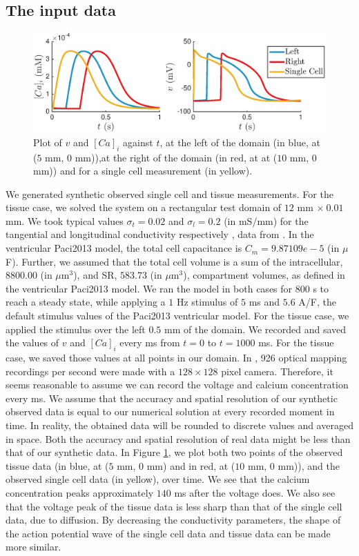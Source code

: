 \documentclass[12pt,a4paper]{article}
\begin{document}
\subsection{The input data} \label{The input data}
%
\begin{figure}
   \includegraphics[width=1\linewidth]{strip} 
    \caption{Plot of $v$ and $[Ca]_i$ against $t$, at the left of the domain (in blue, at ($5$ mm, $0$ mm)),at the right of the domain (in red, at at ($10$ mm, $0$ mm)) and for a single cell measurement (in yellow).}
    \label{fig:3}
\end{figure}
%
We generated synthetic observed single cell and tissue measurements. For the tissue case, we solved the system on a rectangular test domain of $12$ mm $\times\: 0.01$ mm. We took typical values $\sigma_t=0.02$ and $\sigma_l=0.2$ (in mS/mm) for the tangential and longitudinal conductivity respectively \cite{Roth}, data from \cite{Plonsey1882, Plonsey1984}. In the ventricular Paci2013 model, the total cell capacitance is $C_m=9.87109e-5$ (in $\mu$F). Further, we assumed that the total cell volume is a sum of the intracellular, $8800.00$ (in $\mu$m$^3$), and SR, $583.73$ (in $\mu$m$^3$), compartment volumes, as defined in the ventricular Paci2013 model.
We ran the model in both cases for 800 s to reach a steady state, while applying a $1$ Hz stimulus of $5$ ms and $5.6$ A/F, the default stimulus values of the Paci2013 ventricular model. For the tissue case, we applied the stimulus over the left $0.5$ mm of the domain. We recorded and saved the values of $v$ and $[Ca]_i$ every ms from $t=0$ to $t=1000$ ms. For the tissue case, we saved those values at all points in our domain. In \cite{Lee2012}, 926 optical mapping recordings per second were made with a $128 \times 128$ pixel camera. Therefore, it seems reasonable to assume we can record the voltage and calcium concentration every ms. We assume that the accuracy and spatial resolution of our synthetic observed data is equal to our numerical solution at every recorded moment in time. In reality, the obtained data will be rounded to discrete values and averaged in space. Both the accuracy and spatial resolution of real data might be less than that of our synthetic data. In Figure \ref{fig:3}, we plot both two points of the observed tissue data (in blue, at ($5$ mm, $0$ mm) and in red, at ($10$ mm, $0$ mm)), and the observed single cell data (in yellow), over time. We see that the calcium concentration peaks approximately $140$ ms after the voltage does. We also see that the voltage peak of the tissue data is less sharp than that of the single cell data, due to diffusion. By decreasing the conductivity parameters, the shape of the action potential wave of the single cell data and tissue data can be made more similar.
%
\end{document}
